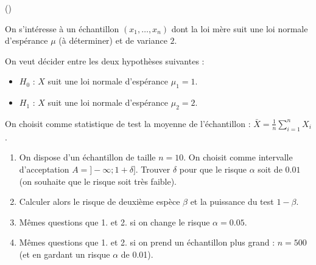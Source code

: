 \begin{exercice}\label{exoInf5} (\minsyndical)

On s'int\'eresse \`a un \'echantillon $(x_1,\ldots,x_n)$ dont la loi m\`ere suit une loi normale d'esp\'erance $\mu$ (\`a d\'eterminer) et de variance $2$.

\medskip

On veut d\'ecider entre les deux hypoth\`eses suivantes :

\begin{itemize}

\item $H_0$ : $X$ suit une loi normale d'esp\'erance $\mu_1 = 1$.


\item $H_1$ : $X$ suit une loi normale d'esp\'erance $\mu_2 = 2$.

\end{itemize}

\medskip

On choisit comme statistique de test la moyenne de l'\'echantillon : $\bar{X} = \frac1n \sum_{i=1}^n X_i$.

\begin{enumerate}

\item On dispose d'un \'echantillon de taille $n=10$. On choisit comme intervalle d'acceptation $A = ] -\infty ; 1 + \delta ]$. Trouver $\delta$ pour que le risque $\alpha$ soit de $0.01$ (on souhaite que le risque soit tr\`es faible).

\item Calculer alors le risque de deuxi\`eme esp\`ece $\beta$ et la puissance du test $1-\beta$. 

\item M\^emes questions que 1. et 2. si on change le risque $\alpha = 0.05$.

\item M\^emes questions que 1. et 2. si on prend un \'echantillon plus grand : $n=500$ (et en gardant un risque $\alpha$ de 0.01).

\end{enumerate}


\end{exercice}
